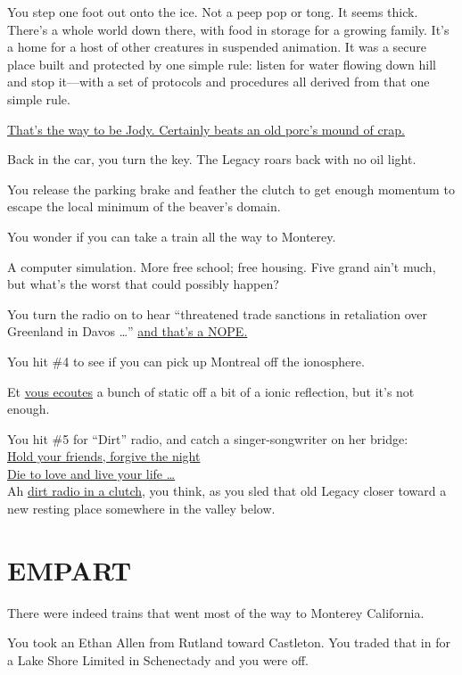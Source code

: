 \documentclass[17pt, twoside, a5paper, openright, extrafontsizes]{memoir}
\renewcommand{\emph}[1]{\ul{#1}}
\begin{document}
You step one foot out onto the ice. Not a peep pop or tong. It seems
thick. There's a whole world down there, with food in storage for a
growing family. It's a home for a host of other creatures in suspended
animation. It was a secure place built and protected by one simple rule:
listen for water flowing down hill and stop it---with a set of protocols
and procedures all derived from that one simple rule.

\emph{That's the way to be Jody. Certainly beats an old porc's mound of
crap.}

Back in the car, you turn the key. The Legacy roars back with no oil
light.

You release the parking brake and feather the clutch to get enough
momentum to escape the local minimum of the beaver's domain.

You wonder if you can take a train all the way to Monterey.

A computer simulation. More free school; free housing. Five grand ain't
much, but what's the worst that could possibly happen?

You turn the radio on to hear ``threatened trade sanctions in
retaliation over Greenland in Davos \ldots{}'' \emph{and that's a NOPE.}

You hit \#4 to see if you can pick up Montreal off the ionosphere.

Et \emph{vous ecoutes} a bunch of static off a bit of a ionic
reflection, but it's not enough.

You hit \#5 for ``Dirt'' radio, and catch a singer-songwriter on her
bridge:\\

\emph{Hold your friends, forgive the night}\\

\emph{Die to love and live your life \ldots{}}\\

Ah \emph{dirt radio in a clutch}, you think, as you sled that old Legacy
closer toward a new resting place somewhere in the valley below.


\chapter{EMPART}

There were indeed trains that went most of the way to Monterey
California.

You took an Ethan Allen from Rutland toward Castleton. You traded that
in for a Lake Shore Limited in Schenectady and you were off.
\end{document}
